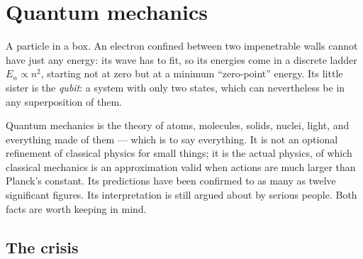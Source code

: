 \chapter{Quantum mechanics}
\label{ch:qm}



\begin{prototype}
A particle in a box. An electron confined between two impenetrable walls cannot have just any energy: its wave has to fit, so its energies come in a discrete ladder $E_n\propto n^2$, starting not at zero but at a minimum ``zero-point'' energy. Its little sister is the \emph{qubit}: a system with only two states, which can nevertheless be in any superposition of them.
\end{prototype}

Quantum mechanics is the theory of atoms, molecules, solids, nuclei, light, and everything made of them --- which is to say everything. It is not an optional refinement of classical physics for small things; it is the actual physics, of which classical mechanics is an approximation valid when actions are much larger than Planck's constant. Its predictions have been confirmed to as many as twelve significant figures. Its interpretation is still argued about by serious people. Both facts are worth keeping in mind.

\section{The crisis}

